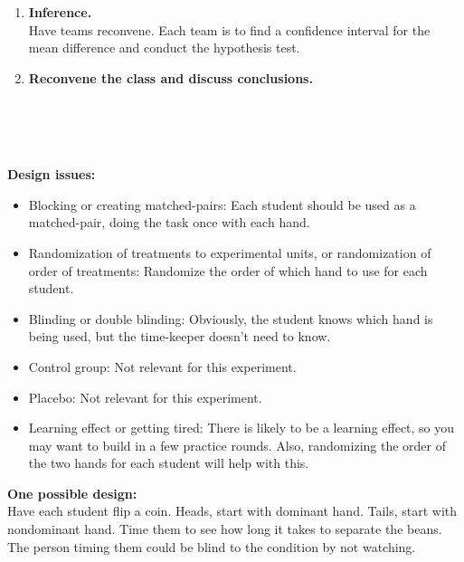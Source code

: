 \begin{enumerate}[leftmargin=*, itemsep=.2em]
\item \textbf{Inference.}\\
Have teams reconvene. Each team is to find a confidence interval for the mean difference and conduct the hypothesis test.

\item \textbf{Reconvene the class and discuss conclusions.}\\
\end{enumerate}
\vspace{12pt}

\noindent{}\\ \noindent{} \\ \noindent{}\\
\vspace{5pt}

\noindent\textbf{Design issues:}
\renewcommand{\labelitemi}{$\closedsucc$}
\begin{itemize}  [leftmargin=1cm, itemsep=.2em]
\item Blocking or creating matched-pairs: Each student should be used as a matched-pair, doing the task once with each hand.
\item Randomization of treatments to experimental units, or randomization of order of treatments: Randomize the order of which hand to use for each student.
\item Blinding or double blinding: Obviously, the student knows which hand is being used, but the time-keeper doesn't need to know.
\item Control group: Not relevant for this experiment.
\item Placebo: Not relevant for this experiment.
\item Learning effect or getting tired: There is likely to be a learning effect, so you may want to build in a few practice rounds. Also, randomizing the order of the two hands for each student will help with this. \\
\end{itemize}

\noindent \textbf{One possible design:} \\
Have each student flip a coin. Heads, start with dominant hand. Tails, start with nondominant hand. Time them to see how long it takes to separate the beans. The person timing them could be blind to the condition by not watching. \\

